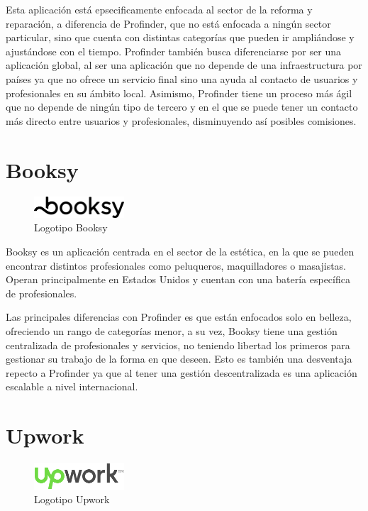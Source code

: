 Esta aplicación está epsecificamente enfocada al sector de la reforma y reparación, a diferencia de Profinder, que no está enfocada a ningún sector particular, sino que cuenta con distintas categorías que pueden ir ampliándose y ajustándose con el tiempo. Profinder también busca diferenciarse por ser una aplicación global, al ser una aplicación que no depende de una infraestructura por países ya que no ofrece un servicio final sino una ayuda al contacto de usuarios y profesionales en su ámbito local. Asimismo, Profinder tiene un proceso más ágil que no depende de ningún tipo de tercero y en el que se puede tener un contacto más directo entre usuarios y profesionales, disminuyendo así posibles comisiones.
\section{Booksy}
\begin{figure}[h]
	\centering
	\includegraphics[width = 0.3\textwidth]{Imagenes/Fuentes/logo_booksy.png}
	\caption{Logotipo Booksy}
	\label{fig:booksy_logo}
\end{figure}

Booksy\hyperlink{cap:biblio}{}
es un aplicación centrada en el sector de la estética, en la que se pueden encontrar distintos profesionales como peluqueros, maquilladores o masajistas. Operan principalmente en Estados Unidos y cuentan con una batería específica de profesionales.

Las principales diferencias con Profinder es que están enfocados solo en belleza, ofreciendo un rango de categorías menor, a su vez, Booksy tiene una gestión centralizada de profesionales y servicios, no teniendo libertad los primeros para gestionar su trabajo de la forma en que deseen. Esto es también una desventaja repecto a Profinder ya que al tener una gestión descentralizada es una aplicación escalable a nivel internacional. 
\newpage
\section{Upwork}
\begin{figure}[h]
	\centering
	\includegraphics[width = 0.3\textwidth]{Imagenes/Fuentes/logo_upwork.png}
	\caption{Logotipo Upwork}
	\label{fig:upwork_logo}
\end{figure}

